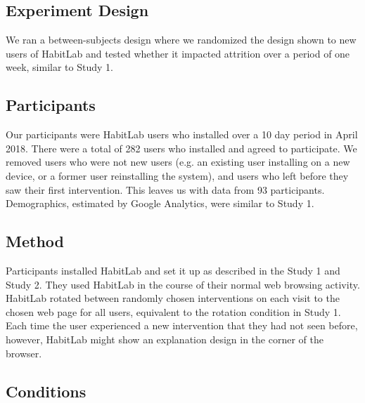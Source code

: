 

\subsection{Experiment Design}

We ran a between-subjects design where we randomized the design shown to new users of HabitLab and tested whether it impacted attrition over a period of one week, similar to Study 1.

\subsection{Participants}

Our participants were HabitLab users who installed over a 10 day period in April 2018. There were a total of 282 users who installed and agreed to participate. We removed users who were not new users (e.g. an existing user installing on a new device, or a former user reinstalling the system), and users who left before they saw their first intervention. This leaves us with data from 93 participants. Demographics, estimated by Google Analytics, were similar to Study 1.

\subsection{Method}
Participants installed HabitLab and set it up as described in the Study 1 and Study 2. They used HabitLab in the course of their normal web browsing activity. HabitLab rotated between randomly chosen interventions on each visit to the chosen web page for all users, equivalent to the rotation condition in Study 1. Each time the user experienced a new intervention that they had not seen before, however, HabitLab might show an explanation design in the corner of the browser.

\subsection{Conditions}

